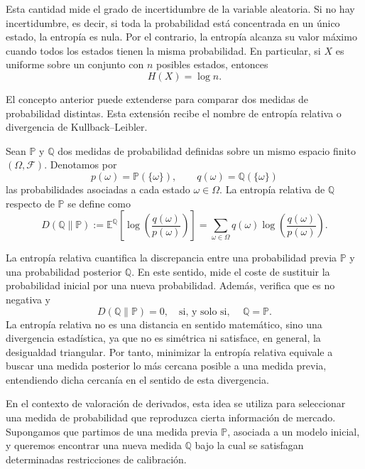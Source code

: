 Esta cantidad mide el grado de incertidumbre de la variable aleatoria. Si no hay incertidumbre, es decir, si toda la probabilidad está concentrada en un único estado, la entropía es nula. Por el contrario, la entropía alcanza su valor máximo cuando todos los estados tienen la misma probabilidad. En particular, si \(X\) es uniforme sobre un conjunto con \(n\) posibles estados, entonces
\[
H(X)=\log n.
\]

El concepto anterior puede extenderse para comparar dos medidas de probabilidad distintas. Esta extensión recibe el nombre de entropía relativa o divergencia de Kullback--Leibler.

\begin{definition}
Sean \(\mathbb{P}\) y \(\mathbb{Q}\) dos medidas de probabilidad definidas sobre un mismo espacio finito \((\Omega,\mathcal{F})\). Denotamos por
\[
p(\omega)=\mathbb{P}(\{\omega\}),
\qquad
q(\omega)=\mathbb{Q}(\{\omega\})
\]
las probabilidades asociadas a cada estado \(\omega\in\Omega\). La entropía relativa de \(\mathbb{Q}\) respecto de \(\mathbb{P}\) se define como
\[
D(\mathbb{Q}\| \mathbb{P})
:=
\mathbb{E}^{\mathbb{Q}}
\left[
\log\left(\frac{q(\omega)}{p(\omega)}\right)
\right]
=
\sum_{\omega\in\Omega}
q(\omega)
\log\left(\frac{q(\omega)}{p(\omega)}\right).
\]
\end{definition}

La entropía relativa cuantifica la discrepancia entre una probabilidad previa \(\mathbb{P}\) y una probabilidad posterior \(\mathbb Q\). En este sentido, mide el coste de sustituir la probabilidad inicial por una nueva probabilidad. Además, verifica que es no negativa y
\[
D(\mathbb{Q}\| \mathbb{P}) = 0, \quad \text{si, y solo si, } \quad \mathbb{Q} = \mathbb P.
\]
La entropía relativa no es una distancia en sentido matemático, sino una divergencia estadística, ya que no es simétrica ni satisface, en general, la desigualdad triangular. Por tanto, minimizar la entropía relativa equivale a buscar una medida posterior lo más cercana posible a una medida previa, entendiendo dicha cercanía en el sentido de esta divergencia.\medskip


En el contexto de valoración de derivados, esta idea se utiliza para seleccionar una medida de probabilidad que reproduzca cierta información de mercado. Supongamos que partimos de una medida previa \(\mathbb{P}\), asociada a un modelo inicial, y queremos encontrar una nueva medida \(\mathbb{Q}\) bajo la cual se satisfagan determinadas restricciones de calibración.

